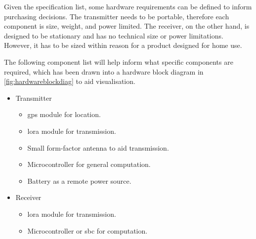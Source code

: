 Given the specification list, some hardware requirements can be defined to inform purchasing decisions.
The transmitter needs to be portable, therefore each component is size, weight, and power limited. The receiver,
on the other hand, is designed to be stationary and has no technical size or power limitations. However, 
it has to be sized within reason for a product designed for home use.

The following component list will help inform what specific components are required, which has been 
drawn into a hardware block diagram in \cref{fig:hardwareblockdiag} to aid visualisation. 
\begin{itemize}
    \item Transmitter
          \begin{itemize}
              \item \acrshort{gps} module for location.
              \item \gls{lora} module for transmission.
              \item Small form-factor antenna to aid transmission.
              \item Microcontroller for general computation.
              \item Battery as a remote power source.
          \end{itemize}
    \item Receiver
          \begin{itemize}
              \item \gls{lora} module for transmission.
              \item Microcontroller or \acrshort{sbc} for computation.
          \end{itemize}
\end{itemize}


